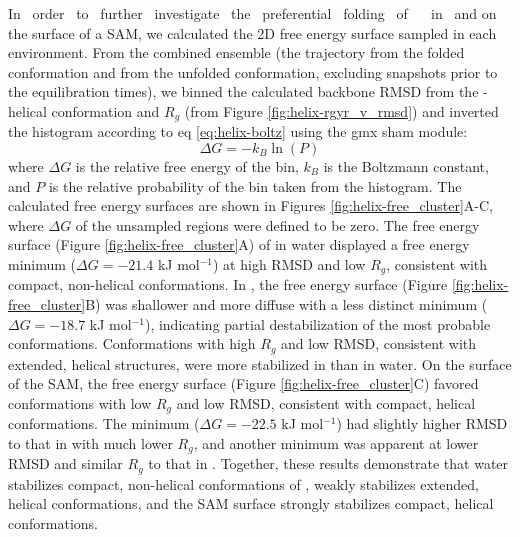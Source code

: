 In~ order~ to~ further~ investigate~ the~ preferential~ folding~ of~ \pep{}~ in~ \tbawat{} and on the surface of a SAM, we calculated the 2D free energy surface sampled in each environment. 
From the combined ensemble (the trajectory from the folded conformation and from the unfolded conformation, excluding snapshots prior to the equilibration times), we binned the calculated backbone RMSD from the \textalpha{}-helical conformation and $R_g$ (from Figure \ref{fig:helix-rgyr_v_rmsd}) and inverted the histogram according to eq \ref{eq:helix-boltz} using the gmx sham module:
\begin{equation}
    \Delta G = -k_B \ln(P)
    \label{eq:helix-boltz}
\end{equation}
where $\Delta G$ is the relative free energy of the bin, $k_B$ is the Boltzmann constant, and $P$ is the relative probability of the bin taken from the histogram. 
The calculated free energy surfaces are shown in Figures \ref{fig:helix-free_cluster}A-C, where $\Delta G$ of the unsampled regions were defined to be zero. 
The free energy surface (Figure \ref{fig:helix-free_cluster}A) of \pep{} in water displayed a free energy minimum ($\Delta G = -21.4$ kJ mol$^{-1}$) at high RMSD and low $R_g$, consistent with compact, non-helical conformations. 
In \tbawat{}, the free energy surface (Figure \ref{fig:helix-free_cluster}B) was shallower and more diffuse with a less distinct minimum ($\Delta G = -18.7$ kJ mol$^{-1}$), indicating partial destabilization of the most probable conformations. 
Conformations with high $R_g$ and low RMSD, consistent with extended, helical structures, were more stabilized in \tbawat{} than in water. 
On the surface of the SAM, the free energy surface (Figure \ref{fig:helix-free_cluster}C) favored conformations with low $R_g$ and low RMSD, consistent with compact, helical conformations. 
The minimum ($\Delta G = -22.5$ kJ mol$^{-1}$) had slightly higher RMSD to that in \tbawat{} with much lower $R_g$, and another minimum was apparent at lower RMSD and similar $R_g$ to that in \tbawat{}. 
Together, these results demonstrate that water stabilizes compact, non-helical conformations of \pep{}, \tbawat{} weakly stabilizes extended, helical conformations, and the SAM surface strongly stabilizes compact, helical conformations.

